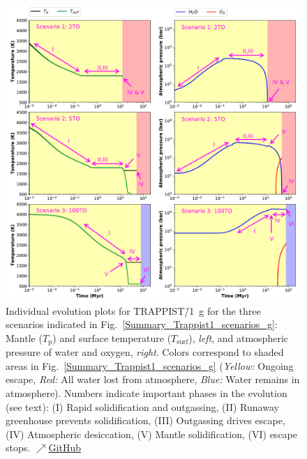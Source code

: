 \documentclass[oneside,twocolumn]{article}
\begin{document}
\begin{figure}[p]
    \centering
    \includegraphics[width=\textwidth]{BarthFig6.pdf}
    \caption{Individual evolution plots for TRAPPIST\=/1~g for the three scenarios indicated in Fig.~\ref{Summary_Trappist1_scenarios_g}: Mantle ($T_\mathrm{p}$) and surface temperature ($T_\mathrm{surf}$), \textit{left}, and atmospheric pressure of water and oxygen, \textit{right}. Colors correspond to shaded areas in Fig.~\ref{Summary_Trappist1_scenarios_g} (\textit{Yellow:} Ongoing escape, \textit{Red:} All water lost from atmosphere, \textit{Blue:} Water remains in atmosphere). Numbers indicate important phases in the evolution (see text): (I) Rapid solidification and outgassing, (II) Runaway greenhouse prevents solidification, (III) Outgassing drives escape, (IV) Atmospheric desiccation, (V) Mantle solidification, (VI)  escape stops.
    \href{https://github.com/pbfeu/Trappist1_MagmOc/tree/public/Fig_Trappist1g_scenarios}{$\nearrow$GitHub}
    }
    \label{Plot_TR1_scenarios_evolution}%
\end{figure}
\end{document}
